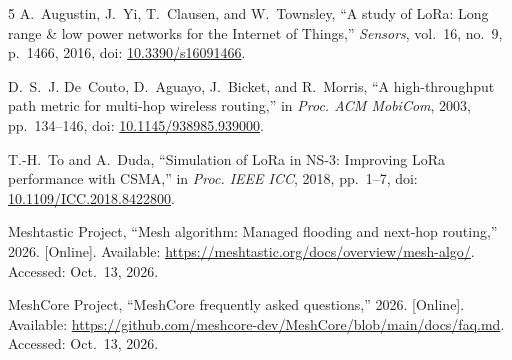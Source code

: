 \documentclass[conference,letterpaper,10pt]{IEEEtran}
\begin{document}
\begin{thebibliography}{5}
A.~Augustin, J.~Yi, T.~Clausen, and W.~Townsley,
``A study of LoRa: Long range \& low power networks for the Internet of Things,''
\emph{Sensors}, vol.~16, no.~9, p.~1466, 2016,
doi: \url{10.3390/s16091466}.

D.~S.~J. De~Couto, D.~Aguayo, J.~Bicket, and R.~Morris,
``A high-throughput path metric for multi-hop wireless routing,''
in \emph{Proc. ACM MobiCom}, 2003, pp.~134--146,
doi: \url{10.1145/938985.939000}.

T.-H.~To and A.~Duda,
``Simulation of LoRa in NS-3: Improving LoRa performance with CSMA,''
in \emph{Proc. IEEE ICC}, 2018, pp.~1--7,
doi: \url{10.1109/ICC.2018.8422800}.

Meshtastic Project,
``Mesh algorithm: Managed flooding and next-hop routing,''
2026. [Online]. Available:
\url{https://meshtastic.org/docs/overview/mesh-algo/}.
Accessed: Oct.~13, 2026.

MeshCore Project, ``MeshCore frequently asked questions,''
2026. [Online]. Available:
\url{https://github.com/meshcore-dev/MeshCore/blob/main/docs/faq.md}.
Accessed: Oct.~13, 2026.
\end{thebibliography}
\end{document}
